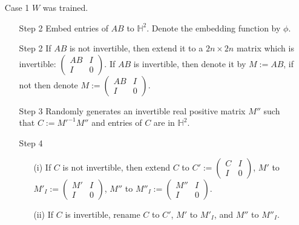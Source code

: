 \documentclass{article}
\theoremstyle{plain}
\theoremstyle{plain} %
\theoremstyle{definition}  %
\theoremstyle{remark}  %
\theoremstyle{plain}
\begin{document}
\begin{itemize}
\item[Case 1]$W$ was trained.
\begin{itemize}
\item[Step 2]
Embed entries of $AB$ to $\mathbb{H}^2$. Denote the embedding function by $\phi$.
\item[Step 2] If $AB$ is not invertible, then extend it to a $2n\times 2n$ matrix which is invertible:
$\begin{pmatrix}
AB & I\\
I & 0
\end{pmatrix}$. If $AB$ is invertible, then denote it by $M:=AB$, if not then denote $M:=\begin{pmatrix}
AB & I\\
I & 0
\end{pmatrix}.$


\item[Step 3] Randomly generates an invertible real positive matrix $M''$ such that $C:=M'^{-1}M''$ and entries of $C$ are in $\mathbb{H}^2$.

\item[Step 4]
\begin{itemize}
\item[(i)] If $C$ is not invertible, then extend $C$ to $C':=\begin{pmatrix}
C & I\\
I & 0
\end{pmatrix}$, $M'$ to $M'_I:=\begin{pmatrix}
M '& I\\
I & 0
\end{pmatrix}$, $M''$ to $M''_I:=\begin{pmatrix}
M'' & I\\
I & 0
\end{pmatrix}$.
\item[(ii)] If $C$ is invertible, rename $C$ to $C'$, $M'$ to $M'_I$, and $M''$ to $M''_I$.
\end{itemize}



\end{itemize}
\end{itemize}
\end{document}
